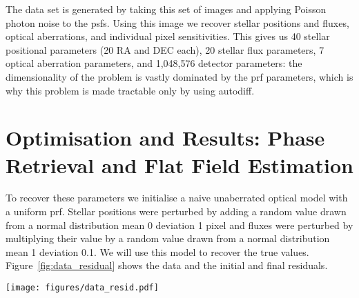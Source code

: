 \documentclass[]{spieman}
\begin{document}
The data set is generated by taking this set of images and applying Poisson photon noise to the \ac{psf}s.%
Using this image we recover stellar positions and fluxes, optical aberrations, and individual pixel sensitivities. This gives us 40 stellar positional parameters (20 RA and DEC each), 20 stellar flux parameters, 7 optical aberration parameters, and 1,048,576 detector parameters: the dimensionality of the problem is vastly dominated by the \ac{prf} parameters, which is why this problem is made tractable only by using autodiff.


\section{Optimisation and Results: Phase Retrieval and Flat Field Estimation}
\label{sec:phaseretrieval}

To recover these parameters we initialise a naive unaberrated optical model with a uniform \ac{prf}. Stellar positions were perturbed by adding a random value drawn from a normal distribution mean 0 deviation 1 pixel and fluxes were perturbed by multiplying their value by a random value drawn from a normal distribution mean 1 deviation 0.1. We will use this model to recover the true values. Figure~\ref{fig:data_residual} shows the data and the initial and final residuals.



\begin{figure*}
    \centering
    \texttt{[image: figures/data\_resid.pdf]}
    \caption{Left: The sum of the images from which the \ac{prf} is recovered. By eye it is clearly difficult to disentangle the astrophysical information. The large number of overlapping \ac{psf}s is chosen in order to spread light across the majority of the detector so that we encode the \ac{prf} information for as much of the detector as possible. Middle: The sum of the residual of the data and the initial uncalibrated model. Clearly these residuals are large, showing that there is a large amount of calibration required. Right: This same residual after the model has been optimised. The residual values are much smaller with no discernable structure remaining. A small zoomed region is shown so that the individual pixel-level residuals can be seen.}
    \label{fig:data_residual}
\end{figure*}
\end{document}
